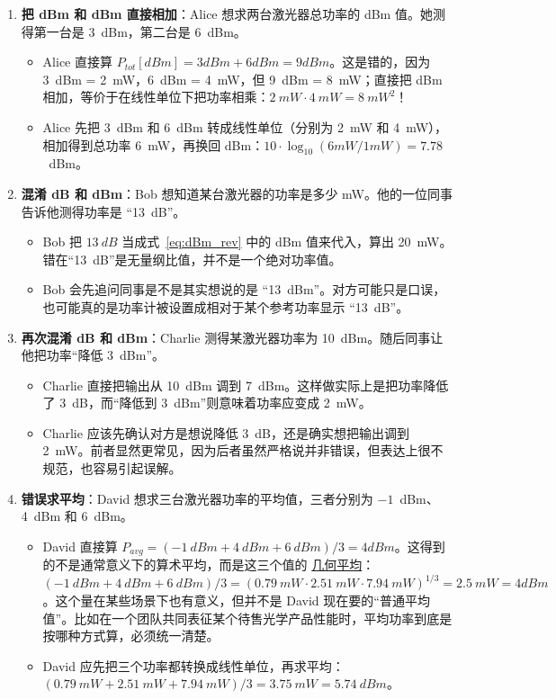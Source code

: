 \begin{enumerate}
    \item \textbf{把 dBm 和 dBm 直接相加}：Alice 想求两台激光器总功率的 dBm 值。她测得第一台是 3~dBm，第二台是 6~dBm。
    \begin{itemize}
    \item[\redcross] Alice 直接算 $P_{tot} [dBm] = 3dBm + 6dBm = 9dBm$。这是错的，因为 3~dBm = 2~mW，6~dBm = 4~mW，但 9~dBm = 8~mW；直接把 dBm 相加，等价于在线性单位下把功率相乘：$2~mW\cdot4~mW = 8~mW^2$！
    \item[\greencheck] Alice 先把 3~dBm 和 6~dBm 转成线性单位（分别为 2~mW 和 4~mW），相加得到总功率 6~mW，再换回 dBm：$10\cdot\log_{10}(6mW/1mW)=7.78$~dBm。
    \end{itemize}

    \item \textbf{混淆 dB 和 dBm}：Bob 想知道某台激光器的功率是多少 mW。他的一位同事告诉他测得功率是 “13~dB”。
    \begin{itemize}
    \item[\redcross] Bob 把 $13~dB$ 当成式~\ref{eq:dBm_rev} 中的 dBm 值来代入，算出 20~mW。错在“13~dB”是无量纲比值，并不是一个绝对功率值。
    \item[\greencheck] Bob 会先追问同事是不是其实想说的是 “13~dBm”。对方可能只是口误，也可能真的是功率计被设置成相对于某个参考功率显示 “13~dB”。
    \end{itemize}

   \item \textbf{再次混淆 dB 和 dBm}：Charlie 测得某激光器功率为 10~dBm。随后同事让他把功率“降低 3~dBm”。
    \begin{itemize}
    \item[\redcross] Charlie 直接把输出从 10~dBm 调到 7~dBm。这样做实际上是把功率降低了 3~dB，而“降低到 3~dBm”则意味着功率应变成 2~mW。
    \item[\greencheck] Charlie 应该先确认对方是想说降低 3~dB，还是确实想把输出调到 2~mW。前者显然更常见，因为后者虽然严格说并非错误，但表达上很不规范，也容易引起误解。
    \end{itemize}

    \item \textbf{错误求平均}：David 想求三台激光器功率的平均值，三者分别为 $-1$~dBm、4~dBm 和 6~dBm。
    \begin{itemize}
    \item[\redcross] David 直接算 $P_{avg}=(-1~dBm+4~dBm+6~dBm)/3=4dBm$。这得到的不是通常意义下的算术平均，而是这三个值的 \href{https://en.wikipedia.org/wiki/Geometric_mean}{几何平均}：$(-1~dBm+4~dBm+6~dBm)/3 = (0.79~mW\cdot2.51~mW\cdot7.94~mW)^{1/3}=2.5~mW = 4dBm$。这个量在某些场景下也有意义，但并不是 David 现在要的“普通平均值”。比如在一个团队共同表征某个待售光学产品性能时，平均功率到底是按哪种方式算，必须统一清楚。
    \item[\greencheck] David 应先把三个功率都转换成线性单位，再求平均：$(0.79~mW+2.51~mW+7.94~mW)/3=3.75~mW=5.74~dBm$。
    \end{itemize}



\end{enumerate}

